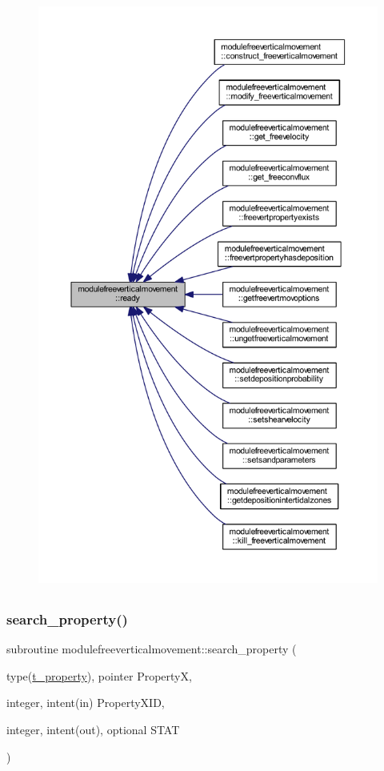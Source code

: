 \begin{figure}[H]
\begin{center}
\leavevmode
\includegraphics[height=550pt]{namespacemodulefreeverticalmovement_a6822a6ac8c2596feb6110b6fa936b42b_icgraph}
\end{center}
\end{figure}
\mbox{\label{namespacemodulefreeverticalmovement_a7533a239e57263d95d53d832615113be}} 
\subsubsection{\texorpdfstring{search\+\_\+property()}{search\_property()}}
{\footnotesize\ttfamily subroutine modulefreeverticalmovement\+::search\+\_\+property (\begin{DoxyParamCaption}\item[{type(\mbox{\hyperlink{structmodulefreeverticalmovement_1_1t__property}{t\+\_\+property}}), pointer}]{PropertyX,  }\item[{integer, intent(in)}]{Property\+X\+ID,  }\item[{integer, intent(out), optional}]{S\+T\+AT }\end{DoxyParamCaption})\hspace{0.3cm}{\ttfamily [private]}}

